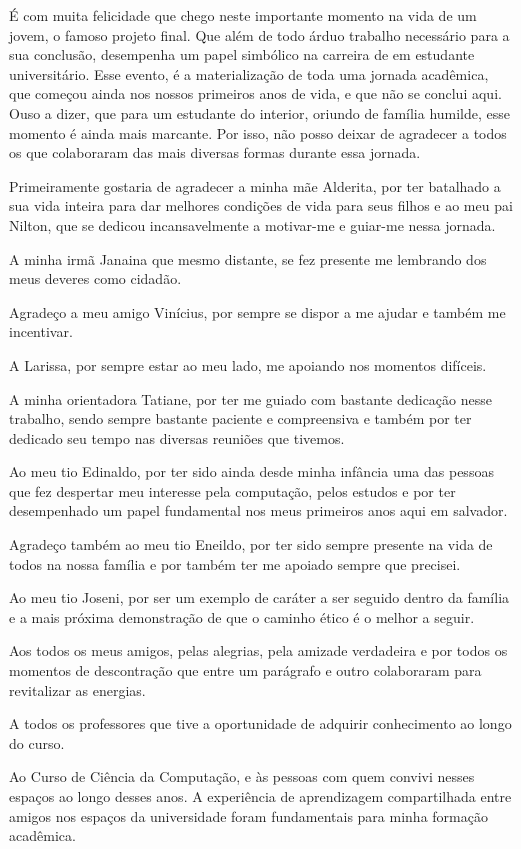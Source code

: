 É com muita felicidade que chego neste importante momento na vida de um jovem, o famoso projeto
final. Que além de todo árduo trabalho necessário para a sua conclusão, desempenha um papel
simbólico na carreira de em estudante universitário. Esse evento, é a materialização de toda uma
jornada acadêmica, que começou ainda nos nossos primeiros anos de vida, e que não se conclui aqui.
Ouso a dizer, que para um estudante do interior, oriundo de família humilde, esse momento é ainda
mais marcante. Por isso, não posso deixar
de agradecer a todos os que colaboraram das mais diversas formas durante essa jornada.

Primeiramente gostaria de agradecer a minha mãe Alderita, por ter batalhado a sua vida inteira para
dar melhores condições de vida para seus filhos e ao meu pai Nilton, que se dedicou incansavelmente a
motivar-me e guiar-me nessa jornada. 

A minha irmã Janaina que mesmo distante, se fez presente me lembrando
dos meus deveres como cidadão.

Agradeço a meu amigo Vinícius, por sempre se dispor a me ajudar e também me incentivar. 

A Larissa, por sempre estar ao meu lado, me apoiando nos momentos difíceis. 

A minha orientadora Tatiane, por ter me guiado com bastante dedicação nesse trabalho, sendo sempre
bastante paciente e compreensiva e também por ter dedicado seu tempo nas diversas reuniões que
tivemos.

Ao meu tio Edinaldo, por ter sido ainda desde minha infância uma das pessoas que fez despertar meu
interesse pela computação, pelos estudos e por ter desempenhado um papel fundamental nos meus
primeiros anos aqui em salvador.

Agradeço também ao meu tio Eneildo, por ter sido sempre presente na vida de todos na nossa família e
por também ter me apoiado sempre que precisei.

Ao meu tio Joseni, por ser um exemplo de caráter a ser seguido dentro da família e a mais próxima
demonstração de que o caminho ético é o melhor a seguir. 

Aos todos os meus amigos, pelas alegrias, pela amizade verdadeira e por todos os momentos de
descontração que entre um parágrafo e outro colaboraram para revitalizar as energias.

A todos os professores que tive a oportunidade de adquirir conhecimento ao longo do curso.

Ao Curso de Ciência da Computação, e às pessoas com quem convivi nesses espaços ao longo desses
anos. A experiência de aprendizagem compartilhada entre amigos nos espaços da universidade foram
fundamentais para minha formação acadêmica.
